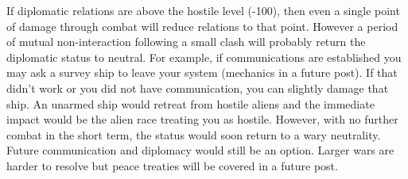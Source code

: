 \documentclass[../../Aurora C# unofficial manual.tex]{subfiles}
\begin{document}
	If diplomatic relations are above the hostile level (-100), then even a single point of damage through combat will reduce relations to that point. However a period of mutual non-interaction following a small clash will probably return the diplomatic status to neutral. For example, if communications are established you may ask a survey ship to leave your system (mechanics in a future post). If that didn't work or you did not have communication, you can slightly damage that ship. An unarmed ship would retreat from hostile aliens and the immediate impact would be the alien race treating you as hostile. However, with no further combat in the short term, the status would soon return to a wary neutrality. Future communication and diplomacy would still be an option. Larger wars are harder to resolve but peace treaties will be covered in a future post.
\end{document}
